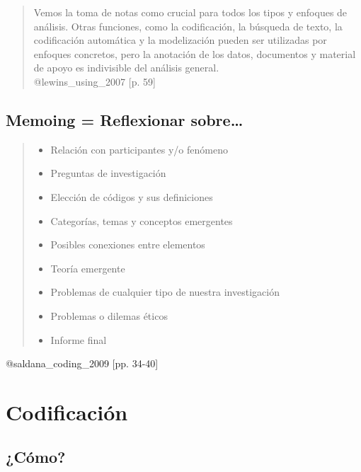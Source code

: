 \begin{quote}
Vemos la toma de notas como {crucial} para todos los tipos y enfoques de
análisis. Otras funciones, como la codificación, la búsqueda de texto,
la codificación automática y la modelización pueden ser utilizadas por
enfoques concretos, pero la anotación de los datos, documentos y
material de apoyo es {indivisible del análisis general}.\\
@lewins\_using\_2007 {[}p. 59{]}
\end{quote}

\hypertarget{memoing-reflexionar}{%
\subsection{Memoing = Reflexionar
sobre\ldots{}}\label{memoing-reflexionar}}

\begin{quote}
\begin{itemize}
\tightlist
\item
  Relación con participantes y/o fenómeno
\item
  Preguntas de investigación
\item
  Elección de códigos y sus definiciones
\item
  Categorías, temas y conceptos emergentes
\item
  Posibles conexiones entre elementos
\item
  Teoría emergente
\item
  Problemas de cualquier tipo de nuestra investigación
\item
  Problemas o dilemas éticos
\item
  Informe final
\end{itemize}
\end{quote}

@saldana\_coding\_2009 {[}pp. 34-40{]}

\hypertarget{codificacion}{%
\section{Codificación}\label{codificacion}}

\hypertarget{como}{%
\subsection{¿Cómo?}\label{como}}

